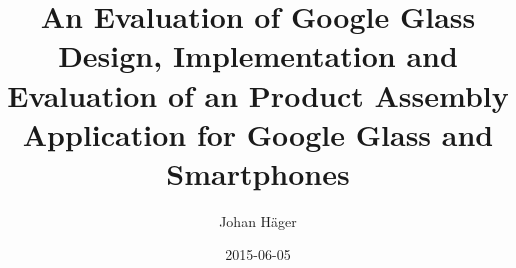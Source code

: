 \documentclass[12pt,twoside]{kau_report}
\title{An Evaluation of Google Glass\\ 
\large Design, Implementation and Evaluation of an Product Assembly Application for Google Glass and Smartphones}
\author{Johan H\"{a}ger}
\date{2015-06-05}
\begin{document}
\makekautitle
\makeswekautitle

\copyrightpage

\begin{frontmatter}

\approved


\end{frontmatter}
\end{document}
